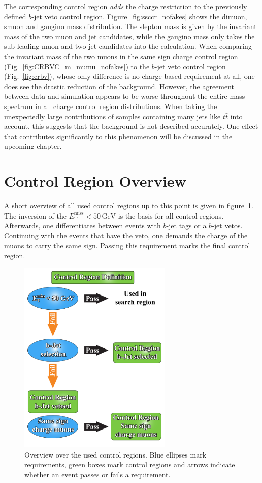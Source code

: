 The corresponding control region \textit{adds} the charge restriction to the previously defined $b$-jet veto control region. Figure~\ref{fig:ssccr_nofakes} shows the dimuon, smuon and gaugino mass distribution. The slepton mass is given by the invariant mass of the two muon and jet candidates, while the gaugino mass only takes the sub-leading muon and two jet candidates into the calculation. When comparing the invariant mass of the two muons in the same sign charge control region (Fig.~\ref{fig:CRBVC_m_mumu_nofakes}) to the $b$-jet veto control region (Fig.~\ref{fig:crbv}), whose only difference is no charge-based requirement at all, one does see the drastic reduction of the background. However, the agreement between data and simulation appears to be worse throughout the entire mass spectrum in all charge control region distributions. When taking the unexpectedly large contributions of samples containing many jets like $t\bar{t}$ into account, this suggests that the background is not described accurately. One effect that contributes significantly to this phenomenon will be discussed in the upcoming chapter.


\section{Control Region Overview}
\label{sec:cr-overview}

A short overview of all used control regions up to this point is given in figure~\ref{fig:cr-overview}. The inversion of the $E^{\text{miss}}_{\text{T}} < 50\,\text{GeV}$ is the basis for all control regions. Afterwards, one differentiates between events with $b$-jet tags or a $b$-jet vetos. Continuing with the events that have the veto, one demands the charge of the muons to carry the same sign. Passing this requirement marks the final control region.

\begin{figure}[!h]
  \centering
  \includegraphics[width=0.65\textwidth]{plots/cr-overview.pdf}
  \caption{Overview over the used control regions. Blue ellipses mark requirements, green boxes mark control regions and arrows indicate whether an event passes or fails a requirement.}
  \label{fig:cr-overview}
\end{figure}


